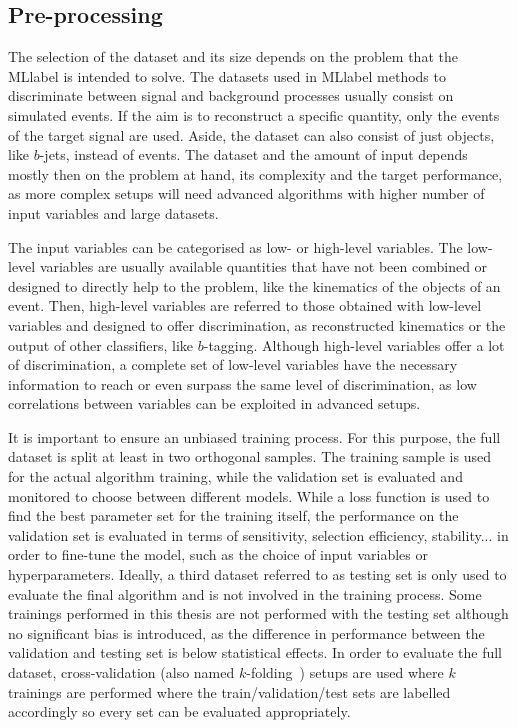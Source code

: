 \subsection{Pre-processing}

The selection of the dataset and its size depends on the problem that the \acrshort{MLlabel} is intended to solve. The datasets used in \acrshort{MLlabel} methods to discriminate between signal and background processes usually consist on simulated events. If the aim is to reconstruct a specific quantity, only the events of the target signal are used. Aside, the dataset can also consist of just objects, like $b$-jets, instead of events. The dataset and the amount of input depends mostly then on the problem at hand, its complexity and the target performance, as more complex setups will need advanced algorithms with higher number of input variables and large datasets.

The input variables can be categorised as low- or high-level variables. The low-level variables are usually available quantities that have not been combined or designed to directly help to the problem, like the kinematics of the objects of an event. Then, high-level variables are referred to those obtained with low-level variables and designed to offer discrimination, as reconstructed kinematics or the output of other classifiers, like $b$-tagging. Although high-level variables offer a lot of discrimination, a complete set of low-level variables have the necessary information to reach or even surpass the same level of discrimination, as low correlations between variables can be exploited in advanced setups.

It is important to ensure an unbiased training process. For this purpose, the full dataset is split at least in two orthogonal samples. The training sample is used for the actual algorithm training, while the validation set is evaluated and monitored to choose between different models. While a loss function is used to find the best parameter set for the training itself, the performance on the validation set is evaluated in terms of sensitivity, selection efficiency, stability... in order to fine-tune the model, such as the choice of input variables or hyperparameters. Ideally, a third dataset referred to as testing set is only used to evaluate the final algorithm and is not involved in the training process. Some trainings performed in this thesis are not performed with the testing set although no significant bias is introduced, as the difference in performance between the validation and testing set is below statistical effects. In order to evaluate the full dataset, cross-validation (also named $k$-folding~\cite{EncyclopediaofML}) setups are used where $k$ trainings are performed where the train/validation/test sets are labelled accordingly so every set can be evaluated appropriately.

